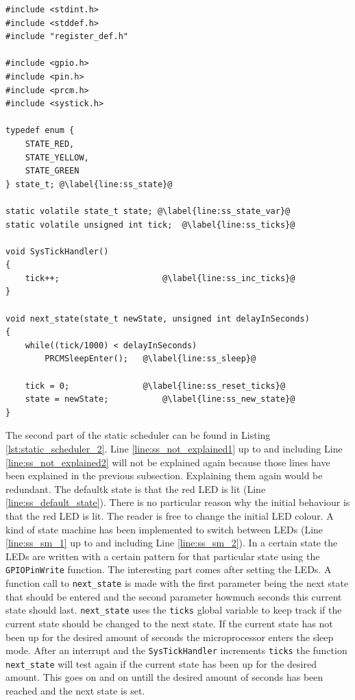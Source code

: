 \begin{lstlisting}[style=CStyle, caption={First part of the static scheduler which defines some data types and states}, captionpos=b, label={lst:static_scheduler_1}, escapechar=@]
#include <stdint.h>
#include <stddef.h>
#include "register_def.h"

#include <gpio.h>
#include <pin.h>
#include <prcm.h>
#include <systick.h>

typedef enum {
    STATE_RED,
    STATE_YELLOW,
    STATE_GREEN
} state_t; @\label{line:ss_state}@

static volatile state_t state; @\label{line:ss_state_var}@
static volatile unsigned int tick;  @\label{line:ss_ticks}@

void SysTickHandler()
{
    tick++;                     @\label{line:ss_inc_ticks}@
}

void next_state(state_t newState, unsigned int delayInSeconds)
{
    while((tick/1000) < delayInSeconds)
        PRCMSleepEnter();   @\label{line:ss_sleep}@

    tick = 0;               @\label{line:ss_reset_ticks}@
    state = newState;           @\label{line:ss_new_state}@
}

\end{lstlisting}


\newpage
The second part of the static scheduler can be found in Listing \ref{lst:static_scheduler_2}.
Line \ref{line:ss_not_explained1} up to and including Line \ref{line:ss_not_explained2} will not be explained again because those lines have been explained in the previous subsection.
Explaining them again would be redundant.
The defaultk state is that the red LED is lit (Line \ref{line:ss_default_state}).
There is no particular reason why the initial behaviour is that the red LED is lit.
The reader is free to change the initial LED colour.
A kind of state machine has been implemented to switch between LEDs (Line \ref{line:ss_sm_1} up to and including Line \ref{line:ss_sm_2}).
In a certain state the LEDs are written with a certain pattern for that particular state using the \texttt{GPIOPinWrite} function.
The interesting part comes after setting the LEDs.
A function call to \texttt{next\_state} is made with the first parameter being the next state that should be entered and the second parameter howmuch seconds this current state should last.
\texttt{next\_state} uses the \texttt{ticks} global variable to keep track if the current state should be changed to the next state.
If the current state has not been up for the desired amount of seconds the microprocessor enters the sleep mode.
After an interrupt and the \texttt{SysTickHandler} increments \texttt{ticks} the function \texttt{next\_state} will test again if the current state has been up for the desired amount.
This goes on and on untill the desired amount of seconds has been reached and the next state is set.

